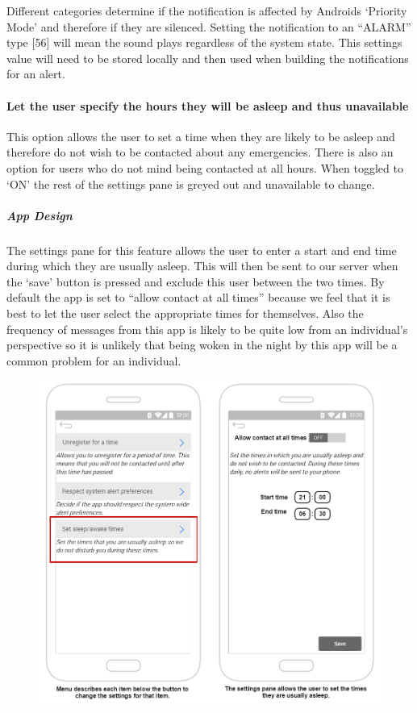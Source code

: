 \documentclass{article}
\begin{document}
Different categories determine if the notification is affected by Androids ‘Priority Mode’ and therefore if they are silenced. Setting the notification to an “ALARM” type [56] will mean the sound plays regardless of the system state. This settings value will need to be stored locally and then used when building the notifications for an alert.

\paragraph{Let the user specify the hours they will be asleep and thus unavailable}
This option allows the user to set a time when they are likely to be asleep and therefore do not wish to be contacted about any emergencies. There is also an option for users who do not mind being contacted at all hours. When toggled to ‘ON’ the rest of the settings pane is greyed out and unavailable to change.
\pagebreak
\subparagraph{App Design}
The settings pane for this feature allows the user to enter a start and end time during which they are usually asleep. This will then be sent to our server when the ‘save’ button is pressed and exclude this user between the two times. By default the app is set to “allow contact at all times” because we feel that it is best to let the user select the appropriate times for themselves. Also the frequency of messages from this app is likely to be quite low from an individual's perspective so it is unlikely that being woken in the night by this app will be a common problem for an individual.\\
	\begin{figure}[H]
		\centering
		\vspace{-20pt}
		\includegraphics[width=1\textwidth]{"Iteration5/Storyboard - Iteration 6 - 3"}
		\vspace{-20pt}
	\end{figure}
	
\end{document}
